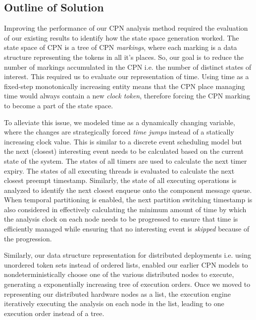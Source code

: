\subsection{Outline of Solution}
Improving the performance of our CPN analysis method required the evaluation of our existing results to identify how the state space generation worked. The state space of CPN is a tree of CPN \emph{markings}, where each marking is a data structure representing the tokens in all it's places. So, our goal is to reduce the number of markings accumulated in the CPN i.e. the number of distinct states of interest. This required us to evaluate our representation of time. Using time as a fixed-step monotonically increasing entity means that the CPN place managing time would always contain a new \emph{clock token}, therefore forcing the CPN marking to become a part of the state space.

To alleviate this issue, we modeled time as a dynamically changing variable, where the changes are strategically forced \emph{time jumps} instead of a statically increasing clock value. This is similar to a discrete event scheduling model but the next (closest) interesting event needs to be calculated based on the current state of the system. The states of all timers are used to calculate the next timer expiry. The states of all executing threads is evaluated to calculate the next closest preempt timestamp. Similarly, the state of all executing operations is analyzed to identify the next closest enqueue onto the component message queue. When temporal partitioning is enabled, the next partition switching timestamp is also considered in effectively calculating the minimum amount of time by which the analysis clock on each node needs to be progressed to ensure that time is efficiently managed while ensuring that no interesting event is \emph{skipped} because of the progression.

Similarly, our data structure representation for distributed deployments i.e. using unordered token sets instead of ordered lists, enabled our earlier CPN models to nondeterministically choose one of the various distributed nodes to execute, generating a exponentially increasing tree of execution orders. Once we moved to representing our distributed hardware nodes as a list, the execution engine iteratively executing the analysis on each node in the list, leading to one execution order instead of a tree. 

